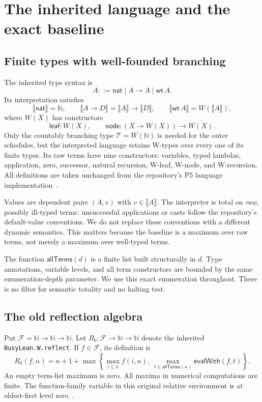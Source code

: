 \documentclass[11pt,letterpaper]{article}
\theoremstyle{definition}
\newcommand{\N}{\mathbb N}
\newcommand{\Tree}{\mathcal T}
\newcommand{\Fam}{\mathcal F}
\newcommand{\leaf}{\mathsf{leaf}}
\newcommand{\node}{\mathsf{node}}
\newcommand{\den}[1]{\llbracket #1\rrbracket}
\newcommand{\code}[1]{\nolinkurl{#1}}
\begin{document}
\section{The inherited language and the exact baseline}
\label{sec:language}

\subsection{Finite types with well-founded branching}

The inherited type syntax is
\[
 A ::= \mathsf{nat}\mid A\to A\mid \mathsf{wt}\,A.
\]
Its interpretation satisfies
\[
 \den{\mathsf{nat}}=\N,\qquad
 \den{A\to D}=\den A\to\den D,\qquad
 \den{\mathsf{wt}\,A}=W(\den A),
\]
where $W(X)$ has constructors
\[
 \leaf:W(X),\qquad \node:(X\to W(X))\to W(X).
\]
Only the countably branching type $\Tree=W(\N)$ is needed for the outer
schedules, but the interpreted language retains W-types over every one of its
finite types. Its raw terms have nine constructors: variables, typed lambdas,
application, zero, successor, natural recursion, W-leaf, W-node, and W-recursion.
All definitions are taken unchanged from the repository's P5 language
implementation~\cite{language}.

Values are dependent pairs $(A,v)$ with $v\in\den A$. The interpreter is total
on \emph{raw}, possibly ill-typed terms: unsuccessful applications or casts
follow the repository's default-value conventions. We do not replace these
conventions with a different dynamic semantics. This matters because the
baseline is a maximum over raw terms, not merely a maximum over well-typed
terms.

The function $\mathsf{allTerms}(d)$ is a finite list built structurally in $d$.
Type annotations, variable levels, and all term constructors are bounded by the
same enumeration-depth parameter. We use this exact enumeration throughout.
There is no filter for semantic totality and no halting test.

\subsection{The old reflection algebra}

Put $\Fam=\N\to\N\to\N$. Let $R_0:\Fam\to\N\to\N$ denote the inherited
\code{BusyLean.W.reflect}. If $f\in\Fam$, its definition is
\begin{equation}
 R_0(f,n)=n+1+\max\left\{
      \max_{i\le n}f(i,n),\ 
      \max_{t\in\mathsf{allTerms}(n)}\mathsf{evalWith}(f,t)
                        \right\}.
\label{eq:oldreflect}
\end{equation}
An empty term-list maximum is zero. All maxima in numerical computations are
finite. The function-family variable in this original relative environment is
at oldest-first level zero~\cite{reflection}.
\end{document}
